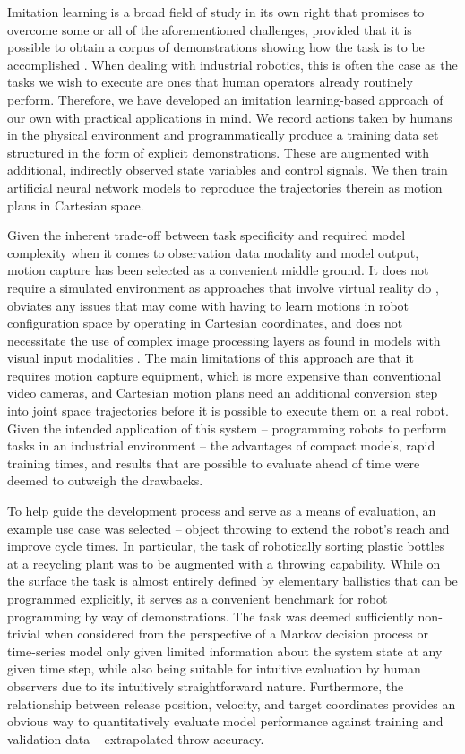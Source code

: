 \documentclass{article}
\begin{document}
Imitation learning is a broad field of study in its own right that promises to overcome some or all of the aforementioned challenges, provided that it is possible to obtain a corpus of demonstrations showing how the task is to be accomplished \citep{attia2018global}. When dealing with industrial robotics, this is often the case as the tasks we wish to execute are ones that human operators already routinely perform. Therefore, we have developed an imitation learning-based approach of our own with practical applications in mind. We record actions taken by humans in the physical environment and programmatically produce a training data set structured in the form of explicit demonstrations. These are augmented with additional, indirectly observed state variables and control signals. We then train artificial neural network models to reproduce the trajectories therein as motion plans in Cartesian space.

Given the inherent trade-off between task specificity and required model complexity when it comes to observation data modality and model output, motion capture has been selected as a convenient middle ground. It does not require a simulated environment as approaches that involve virtual reality do \citep{zhang2018deep,dyrstad2018teaching}, obviates any issues that may come with having to learn motions in robot configuration space by operating in Cartesian coordinates, and does not necessitate the use of complex image processing layers as found in models with visual input modalities \citep{liu2018imitation, zhang2018deep}. The main limitations of this approach are that it requires motion capture equipment, which is more expensive than conventional video cameras, and Cartesian motion plans need an additional conversion step into joint space trajectories before it is possible to execute them on a real robot. Given the intended application of this system -- programming robots to perform tasks in an industrial environment -- the advantages of compact models, rapid training times, and results that are possible to evaluate ahead of time were deemed to outweigh the drawbacks.

To help guide the development process and serve as a means of evaluation, an example use case was selected -- object throwing to extend the robot's reach and improve cycle times. In particular, the task of robotically sorting plastic bottles at a recycling plant was to be augmented with a throwing capability. While on the surface the task is almost entirely defined by elementary ballistics that can be programmed explicitly, it serves as a convenient benchmark for robot programming by way of demonstrations. The task was deemed sufficiently non-trivial when considered from the perspective of a Markov decision process or time-series model only given limited information about the system state at any given time step, while also being suitable for intuitive evaluation by human observers due to its intuitively straightforward nature. Furthermore, the relationship between release position, velocity, and target coordinates provides an obvious way to quantitatively evaluate model performance against training and validation data -- extrapolated throw accuracy.
\end{document}
